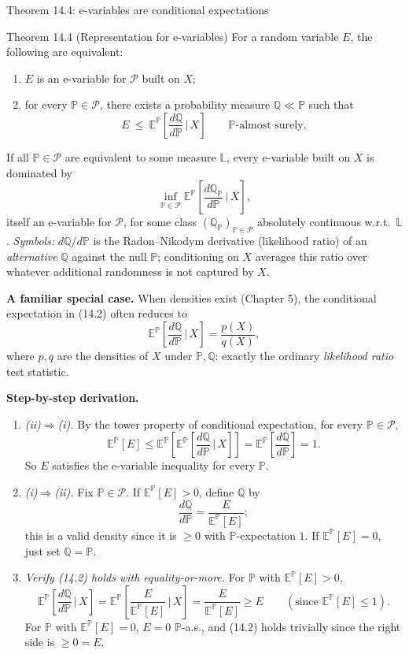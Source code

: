 \documentclass[aspectratio=169,10pt]{beamer}
\newcommand{\PP}{\mathbb{P}}
\newcommand{\QQ}{\mathbb{Q}}
\newcommand{\EE}{\mathbb{E}}
\newcommand{\calP}{\mathcal{P}}
\begin{document}
\begin{frame}[allowframebreaks]{Theorem 14.4: e-variables are conditional expectations}
  \begin{block}{Theorem 14.4 (Representation for e-variables)}
    For a random variable $E$, the following are equivalent:
    \begin{enumerate}
      \item[(i)] $E$ is an e-variable for $\calP$ built on $X$;
      \item[(ii)] for every $\PP \in \calP$, there exists a probability
        measure $\QQ \ll \PP$ such that
        \[
          E \ \leq\ \EE^{\PP}\!\left[\frac{d\QQ}{d\PP} \,\Big|\, X\right]
          \qquad \PP\text{-almost surely.} \tag{14.2}
        \]
    \end{enumerate}
    If all $\PP \in \calP$ are equivalent to some measure $\mathbb{L}$,
    every e-variable built on $X$ is dominated by
    \[
      \inf_{\PP\in\calP} \EE^{\PP}\!\left[\frac{d\QQ_{\PP}}{d\PP}\,\Big|\,X\right],
    \]
    itself an e-variable for $\calP$, for some class $(\QQ_{\PP})_{\PP\in\calP}$
    absolutely continuous w.r.t.\ $\mathbb{L}$.
    \emph{Symbols:} $d\QQ/d\PP$ is the Radon--Nikodym derivative
    (likelihood ratio) of an \emph{alternative} $\QQ$ against the null
    $\PP$; conditioning on $X$ averages this ratio over whatever
    additional randomness is not captured by $X$.
  \end{block}

  \framebreak

  \textbf{A familiar special case.} When densities exist (Chapter 5), the
  conditional expectation in (14.2) often reduces to
  \[
    \EE^{\PP}\!\left[\frac{d\QQ}{d\PP}\,\Big|\,X\right] = \frac{p(X)}{q(X)},
  \]
  where $p, q$ are the densities of $X$ under $\PP, \QQ$: exactly the
  ordinary \emph{likelihood ratio} test statistic.

  \textbf{Step-by-step derivation.}
  \begin{enumerate}
    \item \emph{(ii)$\Rightarrow$(i).} By the tower property of
      conditional expectation, for every $\PP \in \calP$,
      \[
        \EE^{\PP}[E] \leq \EE^{\PP}\!\left[\EE^{\PP}\!\left[\frac{d\QQ}{d\PP}\,\Big|\,X\right]\right]
        = \EE^{\PP}\!\left[\frac{d\QQ}{d\PP}\right] = 1.
      \]
      So $E$ satisfies the e-variable inequality for every $\PP$.
    \item \emph{(i)$\Rightarrow$(ii).} Fix $\PP\in\calP$. If
      $\EE^{\PP}[E] > 0$, define $\QQ$ by
      \[
        \frac{d\QQ}{d\PP} = \frac{E}{\EE^{\PP}[E]};
      \]
      this is a valid density since it is $\geq 0$ with $\PP$-expectation
      $1$. If $\EE^{\PP}[E] = 0$, just set $\QQ = \PP$.
    \item \emph{Verify (14.2) holds with equality-or-more.} For $\PP$ with
      $\EE^{\PP}[E] > 0$,
      \[
        \EE^{\PP}\!\left[\frac{d\QQ}{d\PP}\,\Big|\,X\right]
        = \EE^{\PP}\!\left[\frac{E}{\EE^{\PP}[E]}\,\Big|\,X\right]
        = \frac{E}{\EE^{\PP}[E]} \geq E \qquad (\text{since } \EE^{\PP}[E]\leq 1).
      \]
      For $\PP$ with $\EE^{\PP}[E]=0$, $E=0$ $\PP$-a.s., and (14.2) holds
      trivially since the right side is $\geq 0 = E$.
  \end{enumerate}


\end{frame}
\end{document}
